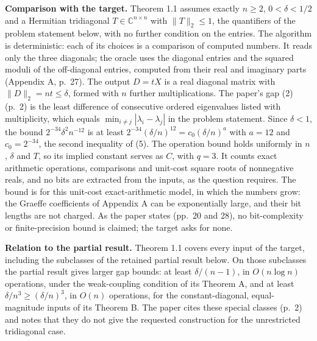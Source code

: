 \documentclass[11pt,a4paper]{article}
\begin{document}
\textbf{Comparison with the target.} Theorem 1.1 assumes exactly
\(n\geq2\), \(0<\delta<1/2\) and a Hermitian tridiagonal
\(T\in\mathbb C^{n\times n}\) with \(\|T\|_2\leq1\), the quantifiers of
the problem statement below, with no further condition on the entries.
The algorithm is deterministic: each of its choices is a comparison of
computed numbers. It reads only the three diagonals; the oracle uses the
diagonal entries and the squared moduli of the off-diagonal entries,
computed from their real and imaginary parts (Appendix A, p.~27). The
output \(D=tX\) is a real diagonal matrix with \(\|D\|_2=nt\leq\delta\),
formed with \(n\) further multiplications. The paper's gap (2) (p.~2) is
the least difference of consecutive ordered eigenvalues listed with
multiplicity, which equals \(\min_{i\ne j}|\lambda_i-\lambda_j|\) in the
problem statement. Since \(\delta<1\), the bound
\(2^{-34}\delta^2n^{-12}\) is at least
\(2^{-34}(\delta/n)^{12}=c_0(\delta/n)^a\) with \(a=12\) and
\(c_0=2^{-34}\), the second inequality of (5). The operation bound holds
uniformly in \(n\), \(\delta\) and \(T\), so its implied constant serves
as \(C\), with \(q=3\). It counts exact arithmetic operations,
comparisons and unit-cost square roots of nonnegative reals, and no bits
are extracted from the inputs, as the question requires. The bound is
for this unit-cost exact-arithmetic model, in which the numbers grow:
the Graeffe coefficients of Appendix A can be exponentially large, and
their bit lengths are not charged. As the paper states (pp.~20 and 28),
no bit-complexity or finite-precision bound is claimed; the target asks
for none.

\textbf{Relation to the partial result.} Theorem 1.1 covers every input
of the target, including the subclasses of the retained partial result
below. On those subclasses the partial result gives larger gap bounds:
at least \(\delta/(n-1)\), in \(O(n\log n)\) operations, under the
weak-coupling condition of its Theorem A, and at least
\(\delta/n^3\ge(\delta/n)^3\), in \(O(n)\) operations, for the
constant-diagonal, equal-magnitude inputs of its Theorem B. The paper
cites these special classes (p.~2) and notes that they do not give the
requested construction for the unrestricted tridiagonal case.
\end{document}
